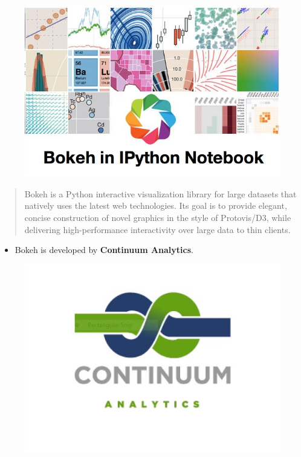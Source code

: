 \documentclass[a4paper,12pt]{article}
\begin{document}
	\large



\begin{figure}[h!]
\centering
\includegraphics[width=0.9\linewidth]{images/TitleSlide}
\end{figure}

\begin{quote}
Bokeh is a Python interactive visualization library for large datasets that natively uses the latest web technologies. Its goal is to provide elegant, concise construction of novel 
graphics in the style of Protovis/D3, while delivering high-performance interactivity over large data to thin clients.

\end{quote}
\newpage
\begin{itemize}
\item Bokeh is developed by \textbf{Continuum Analytics}.
\end{itemize}
\begin{figure}[h!]
\centering
\includegraphics[width=1.0\linewidth]{images/continuum}
\end{figure}
\end{document}
